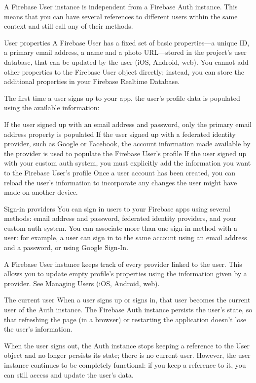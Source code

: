 A Firebase User instance is independent from a Firebase Auth instance. This means that you can have several references to different users within the same context and still call any of their methods.

User properties
A Firebase User has a fixed set of basic properties—a unique ID, a primary email address, a name and a photo URL—stored in the project's user database, that can be updated by the user (iOS, Android, web). You cannot add other properties to the Firebase User object directly; instead, you can store the additional properties in your Firebase Realtime Database.

The first time a user signs up to your app, the user's profile data is populated using the available information:

If the user signed up with an email address and password, only the primary email address property is populated
If the user signed up with a federated identity provider, such as Google or Facebook, the account information made available by the provider is used to populate the Firebase User's profile
If the user signed up with your custom auth system, you must explicitly add the information you want to the Firebase User's profile
Once a user account has been created, you can reload the user's information to incorporate any changes the user might have made on another device.

Sign-in providers
You can sign in users to your Firebase apps using several methods: email address and password, federated identity providers, and your custom auth system. You can associate more than one sign-in method with a user: for example, a user can sign in to the same account using an email address and a password, or using Google Sign-In.

A Firebase User instance keeps track of every provider linked to the user. This allows you to update empty profile's properties using the information given by a provider. See Managing Users (iOS, Android, web).

The current user
When a user signs up or signs in, that user becomes the current user of the Auth instance. The Firebase Auth instance persists the user's state, so that refreshing the page (in a browser) or restarting the application doesn't lose the user's information.

When the user signs out, the Auth instance stops keeping a reference to the User object and no longer persists its state; there is no current user. However, the user instance continues to be completely functional: if you keep a reference to it, you can still access and update the user's data.

